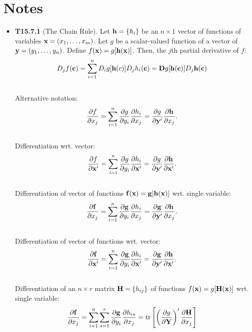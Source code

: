 \documentclass[a4paper, oneside]{book}
\begin{document}





\section{Notes}
 \begin{itemize}
	\item \textbf{T15.7.1} (The Chain Rule). Let $\mathbf{h} = \{h_i\}$ be an $n\times 1$ vector of functions of variables $\mathbf{x}=(x_1,\hdots,x_m)$. Let $g$ be a scalar-valued function of a vector of $\mathbf{y}=(y_1,\hdots,y_n)$. Define $f(\mathbf{x}) = g[\mathbf{h(x)}]$. Then, the $j$th partial derivative of $f$: $$D_j f(\mathbf{c}) = \sum_{i=1}^n D_i g[\mathbf{h}(c)]D_j h_i(\mathbf{c}) = \mathbf{D}g[\mathbf{h(c)}]D_j\mathbf{h(c)}$$\\
	Alternative notation: $$\frac{\partial f}{\partial x_j} = \sum_{i=1}^n \frac{\partial g}{\partial y_i }\frac{\partial h_i}{\partial  x_j} = \frac{\partial g}{\partial \mathbf{y}'}\frac{\partial \mathbf{h}}{\partial x_j}.$$\\
	Differentiation wrt. vector: $$\frac{\partial f}{\partial \mathbf{x}'} = \sum_{i=i}^n \frac{\partial g}{\partial y_i }\frac{\partial h_i}{\partial  \mathbf{x}'} = \frac{\partial g}{\partial \mathbf{y}'}\frac{\partial \mathbf{h}}{\partial \mathbf{x}'}.$$\\
	Differentiation of vector of functions $\mathbf f(\mathbf{x}) = \mathbf g[\mathbf{h(x)}]$ wrt. single variable: 
	$$\frac{\partial \mathbf{f}}{\partial x_j} = \sum_{i=1}^n \frac{\partial \mathbf g}{\partial y_i }\frac{\partial h_i}{\partial  x_j} = \frac{\partial \mathbf g}{\partial \mathbf{y}'}\frac{\partial \mathbf{h}}{\partial x_j}.$$\\
	Differentiation of vector of functions wrt. vector: 
	$$\frac{\partial \mathbf{f}}{\partial \mathbf{x}'} = \sum_{i=1}^n \frac{\partial \mathbf g}{\partial y_i }\frac{\partial h_i}{\partial  \mathbf{x}'} = \frac{\partial \mathbf g}{\partial \mathbf{y}'}\frac{\partial \mathbf{h}}{\partial \mathbf{x}'}.$$\\
	Differentiation of an $n\times r$ matrix $\mathbf H = \{h_{ij}\}$ of functions $f(\mathbf x) = g[\mathbf H(\mathbf x)]$ wrt. single variable: 
	$$\frac{\partial \mathbf{f}}{\partial x_j} = \sum_{i=1}^n \sum_{s=1}^r \frac{\partial \mathbf g}{\partial y_i }\frac{\partial h_{is}}{\partial  x_j} = \text{tr}\left[ \left( \frac{\partial g}{\partial \mathbf Y} \right)' \frac{\partial \mathbf{H}}{\partial x_j} \right]$$
\end{itemize}
\end{document}
